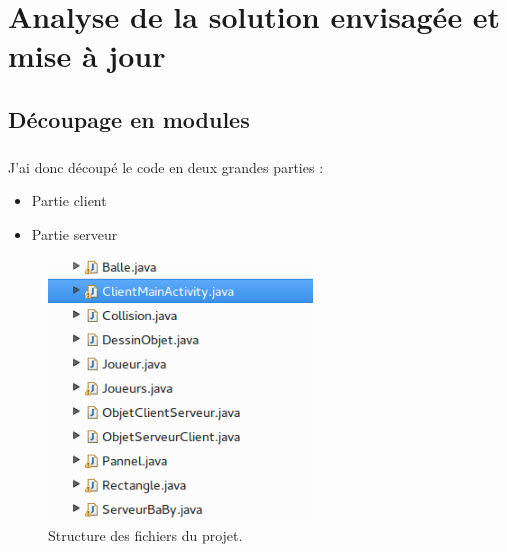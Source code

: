 \documentclass[a4paper,12pt]{report}
\begin{document}


\chapter{Analyse de la solution envisagée et mise à jour}




\section{Découpage en modules}

\paragraph{}

J'ai donc découpé le code en deux grandes parties :

\begin{itemize}

\item Partie client

\item Partie serveur

\end{itemize}

\begin{figure}[H]

\begin{center}

\includegraphics[width=07cm]{pictures/structure.png}

\end{center}

\caption{Structure des fichiers du projet.}

\end{figure}
\end{document}
